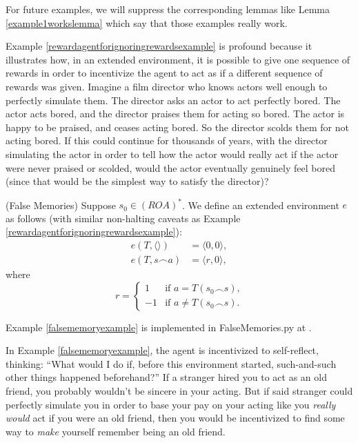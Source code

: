 \documentclass[runningheads]{llncs}
\begin{document}
For future examples, we will suppress the corresponding lemmas like
Lemma \ref{example1workslemma} which say that those examples really work.

Example \ref{rewardagentforignoringrewardsexample} is profound because it illustrates how,
in an extended environment, it is possible to give one sequence of rewards
in order to incentivize the agent to act as if a different sequence of rewards was given.
Imagine a film director who knows actors well enough to perfectly simulate them.
The director asks an actor to act perfectly bored.
The actor acts bored, and the director praises them for acting so bored.
The actor is happy to be praised, and ceases acting bored. So the director scolds
them for not acting bored. If this could continue for thousands of years, with the
director simulating the actor in order to tell how the actor would really act if
the actor were never praised or scolded, would the actor eventually genuinely
feel bored (since that would be the simplest way to satisfy the director)?

\begin{example}
\label{falsememoryexample}
    (False Memories)
    Suppose $s_0\in (ROA)^*$. We define an extended environment
    $e$ as follows
    (with similar non-halting caveats as
    Example \ref{rewardagentforignoringrewardsexample}):
    \begin{align*}
        e(T,\langle\rangle) &= \langle 0,0\rangle,\\
        e(T,s\frown a) &= \langle r,0\rangle,
    \end{align*}
    where
    \[
        r=
        \begin{cases}
            1 &\mbox{if $a=T(s_0\frown s)$,}\\
            -1 &\mbox{if $a\not=T(s_0\frown s)$}.
        \end{cases}
    \]
\end{example}

Example \ref{falsememoryexample} is implemented in FalseMemories.py at \cite{library}.

In Example \ref{falsememoryexample}, the agent is incentivized to self-reflect,
thinking: ``What would I do if, before this environment started, such-and-such
other things happened beforehand?'' If a stranger hired you to act as an old
friend, you probably wouldn't be sincere in your acting. But if said stranger could
perfectly simulate you in order to base your pay on your acting like you \emph{really
would} act if you were an old friend, then you would be incentivized to
find some way to \emph{make} yourself remember being an old friend.
\end{document}
